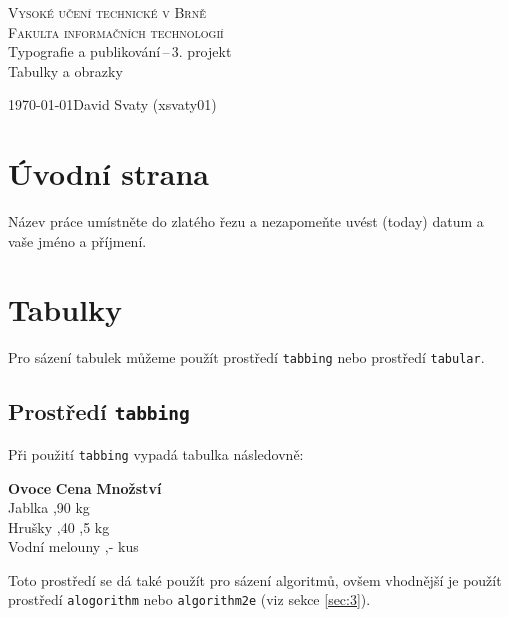 \documentclass[a4paper,11pt, hidelinks]{article}
\begin{document}
    
\begin{titlepage}
    \begin{center}
        {\Huge \textsc{Vysoké učení technické v Brně}\\[0.5em]}
        {\huge \textsc{Fakulta informačních technologií}\\}
        {\LARGE Typografie a publikování\,--\,3. projekt}\\[0.4em]
        {\Huge Tabulky a obrazky \\}
    \end{center}

    {\Large \today \hfill David Svaty (xsvaty01)}
\end{titlepage}

\label{page:1}

\section{Úvodní strana}
\label{sec:1}
Název práce umístněte do zlatého řezu a nezapomeňte uvést  (today) datum a vaše jméno a příjmení.

\section{Tabulky}
\label{sec:2}
Pro sázení tabulek můžeme použít prostředí \texttt{tabbing} nebo prostředí \texttt{tabular}.

\subsection{Prostředí \texttt{tabbing}}
Při použití \texttt{tabbing} vypadá tabulka následovně:
\begin{tabbing}
    \textbf{Ovoce} \hspace{16mm} \= \textbf{Cena} \hspace{4mm} \= \textbf{Množství} \\
    Jablka ,90  kg \\
    Hrušky ,40 ,5 kg \\
    Vodní melouny ,-  kus \\
\end{tabbing}
Toto prostředí se dá také použít pro sázení algoritmů, ovšem vhodnější je použít prostředí \texttt{alogorithm} nebo \texttt{algorithm2e} (viz sekce \ref*{sec:3}).
\end{document}
